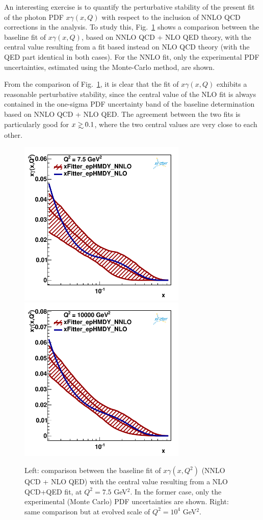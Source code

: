 An interesting exercise is to quantify the perturbative stability of
the present fit of the photon PDF $x\gamma(x,Q)$ with respect to the inclusion
of NNLO QCD corrections in the analysis.
%
To study this, Fig.~\ref{fig:nlo_vs_nnlo} shows a
comparison between the baseline fit of $x\gamma(x,Q)$, based on NNLO
QCD + NLO QED theory, with the central value resulting from a fit
based instead on NLO QCD theory (with the QED part identical in both
cases).
%
For the NNLO fit, only the experimental PDF uncertainties, estimated
using the Monte-Carlo method, are shown.

From the comparison of Fig.~\ref{fig:nlo_vs_nnlo}, it is clear that the
fit of $x\gamma(x,Q)$ exhibits a reasonable perturbative stability,
since the central value of the NLO fit is always contained in the
one-sigma PDF uncertainty band of the baseline determination based on
NNLO QCD + NLO QED.
%
The agreement between the two fits is particularly good for
$x\gsim 0.1$, where the two central values are very close to each
other.

\begin{figure}[t]
\centering
\includegraphics[width=8cm]{figs/q2_7_5_pdf_ph_NLOvsNNLO.pdf}
\includegraphics[width=8cm]{figs/q2_10000_pdf_ph_NLOvsNNLO.pdf}
\caption{Left: comparison between the baseline
  fit of $x\gamma(x,Q^2)$ (NNLO QCD + NLO QED) with the central value
  resulting from a NLO QCD+QED fit, at $Q^2=7.5$ GeV$^2$.
  In the former case, only the experimental (Monte Carlo) PDF
  uncertainties are shown.
  Right: same comparison but at evolved scale of $Q^2=10^4$ GeV$^2$.  }
\label{fig:nlo_vs_nnlo}
\end{figure}
